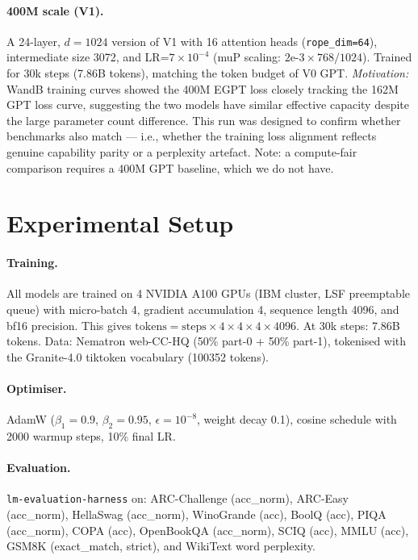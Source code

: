 \documentclass[11pt,a4paper]{article}
\begin{document}
\paragraph{400M scale (V1).}
A 24-layer, $d=1024$ version of V1 with 16 attention heads (\texttt{rope\_dim=64}),
intermediate size 3072, and LR=$7\times10^{-4}$ (muP scaling: $2\text{e-3} \times 768/1024$).
Trained for 30k steps (7.86B tokens), matching the token budget of V0 GPT.
\emph{Motivation:} WandB training curves showed the 400M EGPT loss closely tracking the
162M GPT loss curve, suggesting the two models have similar effective capacity despite the
large parameter count difference.
This run was designed to confirm whether benchmarks also match --- i.e., whether the
training loss alignment reflects genuine capability parity or a perplexity artefact.
Note: a compute-fair comparison requires a 400M GPT baseline, which we do not have.

\section{Experimental Setup}

\paragraph{Training.}
All models are trained on 4 NVIDIA A100 GPUs (IBM cluster, LSF preemptable queue)
with micro-batch 4, gradient accumulation 4, sequence length 4096, and bf16 precision.
This gives $\text{tokens} = \text{steps} \times 4 \times 4 \times 4 \times 4096$.
At 30k steps: 7.86B tokens.
Data: Nematron web-CC-HQ (50\% part-0 + 50\% part-1), tokenised with the Granite-4.0
tiktoken vocabulary (100352 tokens).

\paragraph{Optimiser.}
AdamW ($\beta_1=0.9$, $\beta_2=0.95$, $\epsilon=10^{-8}$, weight decay 0.1),
cosine schedule with 2000 warmup steps, 10\% final LR.

\paragraph{Evaluation.}
\texttt{lm-evaluation-harness} on: ARC-Challenge (acc\_norm), ARC-Easy (acc\_norm),
HellaSwag (acc\_norm), WinoGrande (acc), BoolQ (acc), PIQA (acc\_norm), COPA (acc),
OpenBookQA (acc\_norm), SCIQ (acc), MMLU (acc), GSM8K (exact\_match, strict),
and WikiText word perplexity.
\end{document}
